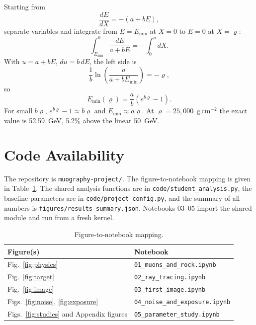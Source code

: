 \documentclass{article}
\begin{document}
Starting from
\begin{equation}
\frac{dE}{dX}=-(a+bE),
\end{equation}
separate variables and integrate from $E=E_{\min}$ at $X=0$ to $E=0$ at
$X=\varrho$:
\begin{equation}
\int_{E_{\min}}^{0}\frac{dE}{a+bE}=-\int_{0}^{\varrho}dX.
\end{equation}
With $u=a+bE$, $du=b\,dE$, the left side is
\begin{equation}
\frac{1}{b}\ln\left(\frac{a}{a+bE_{\min}}\right)=-\varrho,
\end{equation}
so
\begin{equation}
E_{\min}(\varrho)=\frac{a}{b}\left(e^{b\varrho}-1\right).
\end{equation}
For small $b\varrho$, $e^{b\varrho}-1\approx b\varrho$ and
$E_{\min}\approx a\varrho$. At $\varrho=25{,}000$~g\,cm$^{-2}$ the exact value
is 52.59~GeV, 5.2\% above the linear 50~GeV.

\section{Code Availability}
\label{app:code}

\begin{sloppypar}
The repository is \texttt{muography-project/}. The figure-to-notebook mapping
is given in Table~\ref{tab:code}. The shared analysis functions are in
\texttt{code/student\_analysis.py}, the baseline parameters are in
\texttt{code/project\_config.py}, and the summary of all numbers is
\texttt{figures/results\_summary.json}. Notebooks 03--05 import the shared
module and run from a fresh kernel.
\end{sloppypar}

\begin{table}[h]
\centering
\caption{Figure-to-notebook mapping.}
\label{tab:code}
\small
\begin{tabular}{@{}ll@{}}
\toprule
Figure(s) & Notebook \\
\midrule
Fig.~\ref{fig:physics} & \texttt{01\_muons\_and\_rock.ipynb} \\
Fig.~\ref{fig:target} & \texttt{02\_ray\_tracing.ipynb} \\
Fig.~\ref{fig:image} & \texttt{03\_first\_image.ipynb} \\
Figs.~\ref{fig:noise}, \ref{fig:exposure} & \texttt{04\_noise\_and\_exposure.ipynb} \\
Figs.~\ref{fig:studies} and Appendix figures & \texttt{05\_parameter\_study.ipynb} \\
\bottomrule
\end{tabular}
\end{table}
\end{document}
